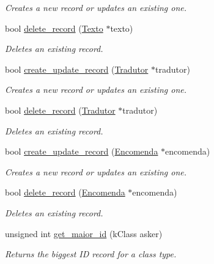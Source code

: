 \begin{DoxyCompactItemize}
\begin{DoxyCompactList}\small\item\em Creates a new record or updates an existing one. \end{DoxyCompactList}\item 
bool \hyperlink{class_database_manager_aedc255310da21463f3297f3333898605}{delete\-\_\-record} (\hyperlink{class_texto}{Texto} $\ast$texto)
\begin{DoxyCompactList}\small\item\em Deletes an existing record. \end{DoxyCompactList}\item 
bool \hyperlink{class_database_manager_a587389f45912fee630df72658a4d09b0}{create\-\_\-update\-\_\-record} (\hyperlink{class_tradutor}{Tradutor} $\ast$tradutor)
\begin{DoxyCompactList}\small\item\em Creates a new record or updates an existing one. \end{DoxyCompactList}\item 
bool \hyperlink{class_database_manager_a861c8ab275b7d9e100ebb71889578c40}{delete\-\_\-record} (\hyperlink{class_tradutor}{Tradutor} $\ast$tradutor)
\begin{DoxyCompactList}\small\item\em Deletes an existing record. \end{DoxyCompactList}\item 
bool \hyperlink{class_database_manager_a10fd54af873e6902a3a6ee45f71eb42c}{create\-\_\-update\-\_\-record} (\hyperlink{class_encomenda}{Encomenda} $\ast$encomenda)
\begin{DoxyCompactList}\small\item\em Creates a new record or updates an existing one. \end{DoxyCompactList}\item 
bool \hyperlink{class_database_manager_aa78e5396d0be88098a97703f31fb72ec}{delete\-\_\-record} (\hyperlink{class_encomenda}{Encomenda} $\ast$encomenda)
\begin{DoxyCompactList}\small\item\em Deletes an existing record. \end{DoxyCompactList}\item 
unsigned int \hyperlink{class_database_manager_a5af3db3952fc2af64a43fd0403138c04}{get\-\_\-maior\-\_\-id} (k\-Class asker)
\begin{DoxyCompactList}\small\item\em Returns the biggest I\-D record for a class type. \end{DoxyCompactList}\end{DoxyCompactItemize}


